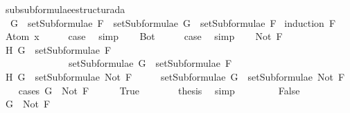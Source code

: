 \begin{isabellebody}
\begin{isamarkuptext}
\end{isamarkuptext}\isamarkuptrue%
\isamarkupfalse%
\ subsubformulae{\isacharunderscore}estructurada{\isacharcolon}\ \isanewline
\ \ {\isachardoublequoteopen}G\ {\isasymin}\ setSubformulae\ F\ {\isasymLongrightarrow}\ setSubformulae\ G\ {\isasymsubseteq}\ setSubformulae\ F{\isachardoublequoteclose}\isanewline
%
\isadelimproof
%
\endisadelimproof
%
\isatagproof
{}\isamarkupfalse%
\ {\isacharparenleft}induction\ F{\isacharparenright}\isanewline
\ \ \isamarkupfalse%
\ {\isacharparenleft}Atom\ x{\isacharparenright}\isanewline
\ \ \isamarkupfalse%
\ \isamarkupfalse%
\ {\isacharquery}case\ \isamarkupfalse%
\ simp\isanewline
{}\isamarkupfalse%
\isanewline
\ \ \isamarkupfalse%
\ Bot\isanewline
\ \ \isamarkupfalse%
\ \isamarkupfalse%
\ {\isacharquery}case\ \isamarkupfalse%
\ simp\isanewline
{}\isamarkupfalse%
\isanewline
\ \ \isamarkupfalse%
\ {\isacharparenleft}Not\ F{\isacharparenright}\isanewline
\ \ \isamarkupfalse%
\ H{}{\isacharcolon}\ {\isachardoublequoteopen}G\ {\isasymin}\ setSubformulae\ F\ {\isasymLongrightarrow}\ \isanewline
\ \ \ \ \ \ \ \ \ \ \ \ \ \ setSubformulae\ G\ {\isasymsubseteq}\ setSubformulae\ F{\isachardoublequoteclose}\isanewline
\ \ \isamarkupfalse%
\ H{}{\isacharcolon}\ {\isachardoublequoteopen}G\ {\isasymin}\ setSubformulae\ {\isacharparenleft}Not\ F{\isacharparenright}{\isachardoublequoteclose}\isanewline
\ \ \isamarkupfalse%
\ \isamarkupfalse%
\ {\isachardoublequoteopen}setSubformulae\ G\ {\isasymsubseteq}\ setSubformulae\ {\isacharparenleft}Not\ F{\isacharparenright}{\isachardoublequoteclose}\isanewline
\ \ \isamarkupfalse%
\ {\isacharparenleft}cases\ {\isachardoublequoteopen}G\ {\isacharequal}\ Not\ F{\isachardoublequoteclose}{\isacharparenright}\isanewline
\ \ \ \ \isamarkupfalse%
\ True\isanewline
\ \ \ \ \isamarkupfalse%
\ \isamarkupfalse%
\ {\isacharquery}thesis\ \isamarkupfalse%
\ simp\isanewline
\ \ \isamarkupfalse%
\isanewline
\ \ \ \ \isamarkupfalse%
\ False\isanewline
\ \ \ \ \isamarkupfalse%
\ \isamarkupfalse%
\ {\isachardoublequoteopen}G\ {\isasymnoteq}\ Not\ F{\isachardoublequoteclose}\ \isanewline

\end{isabellebody}
